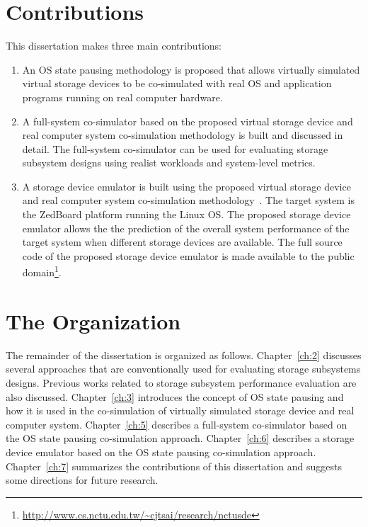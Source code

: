 \section {Contributions}

This dissertation makes three main contributions:

\begin{enumerate}
	\item An OS state pausing methodology is proposed that allows virtually simulated virtual storage devices to be co-simulated with real OS and application programs running on real computer hardware.
	
	\item A full-system co-simulator based on the proposed virtual storage device and real computer system co-simulation methodology is built and discussed in detail. The full-system co-simulator can be used for evaluating storage subsystem designs using realist workloads and system-level metrics.
	
	\item A storage device emulator is built using the proposed virtual storage device and real computer system co-simulation methodology~\cite{Wu:2015}. The target system is the ZedBoard platform running the Linux OS. The proposed storage device emulator allows the the prediction of the overall system performance of the target system when different storage devices are available. The full source code of the proposed storage device emulator is made available to the public domain\footnote{\url{http://www.cs.nctu.edu.tw/~cjtsai/research/nctusde}}.
	 
\end{enumerate}

\section {The Organization}

The remainder of the dissertation is organized as follows. Chapter~\ref{ch:2} discusses several approaches that are conventionally used for evaluating storage subsystems designs. Previous works related to storage subsystem performance evaluation are also discussed. Chapter~\ref{ch:3} introduces the concept of OS state pausing and how it is used in the co-simulation of virtually simulated storage device and real computer system. Chapter~\ref{ch:5} describes a full-system co-simulator based on the OS state pausing co-simulation approach. Chapter~\ref{ch:6} describes a storage device emulator based on the OS state pausing co-simulation approach. Chapter~\ref{ch:7} summarizes the contributions of this dissertation and suggests some directions for future research.
